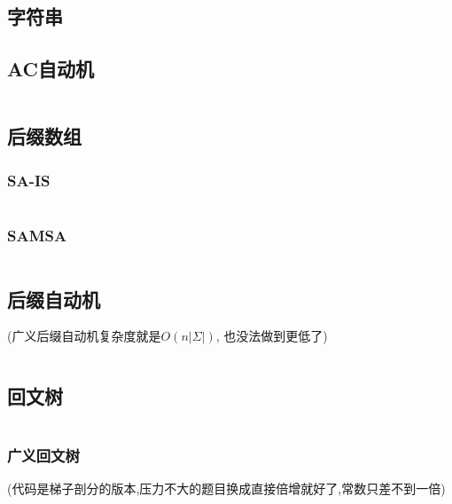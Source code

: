 \documentclass[a4paper]{article}
\begin{document}
\begin{multicols}{2}
			

		\section{字符串}

			\subsection{AC自动机}
				\inputminted{cpp}{../src/string/AC自动机.cpp}

			\subsection{后缀数组}
				\subsubsection{SA-IS}
					\inputminted{cpp}{../src/string/sais.cpp}
			
				\subsubsection{SAMSA}
				 	\inputminted{cpp}{../src/string/SAMSA.cpp}



			\subsection{后缀自动机}
				(广义后缀自动机复杂度就是$O\left(n\left|\Sigma\right|\right)$, 也没法做到更低了)
				\inputminted{cpp}{../src/string/后缀自动机.cpp}

			\subsection{回文树}
				\inputminted{cpp}{../src/string/回文树.cpp}

				\subsubsection{广义回文树}
					(代码是梯子剖分的版本,压力不大的题目换成直接倍增就好了,常数只差不到一倍)
					\inputminted{cpp}{../src/string/广义回文树.cpp}



\end{multicols}
\end{document}
